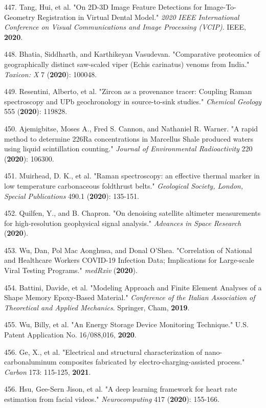 447. Tang, Hui, et al. "On 2D-3D Image Feature Detections for Image-To-Geometry Registration in Virtual Dental Model." \textit{2020 IEEE International Conference on Visual Communications and Image Processing (VCIP)}. IEEE, \textbf{2020}.

448. Bhatia, Siddharth, and Karthikeyan Vasudevan. "Comparative proteomics of geographically distinct saw-scaled viper (Echis carinatus) venoms from India." \textit{Toxicon: X} 7 (\textbf{2020}): 100048.

449. Resentini, Alberto, et al. "Zircon as a provenance tracer: Coupling Raman spectroscopy and UPb geochronology in source-to-sink studies." \textit{Chemical Geology} 555 (\textbf{2020}): 119828.

450. Ajemigbitse, Moses A., Fred S. Cannon, and Nathaniel R. Warner. "A rapid method to determine 226Ra concentrations in Marcellus Shale produced waters using liquid scintillation counting." \textit{Journal of Environmental Radioactivity} 220 (\textbf{2020}): 106300.

451. Muirhead, D. K., et al. "Raman spectroscopy: an effective thermal marker in low temperature carbonaceous fold\textendash{}thrust belts." \textit{Geological Society, London, Special Publications} 490.1 (\textbf{2020}): 135-151.

452. Quilfen, Y., and B. Chapron. "On denoising satellite altimeter measurements for high-resolution geophysical signal analysis." \textit{Advances in Space Research} (\textbf{2020}).

453. Wu, Dan, Pol Mac Aonghusa, and Donal O'Shea. "Correlation of National and Healthcare Workers COVID-19 Infection Data; Implications for Large-scale Viral Testing Programs." \textit{medRxiv} (\textbf{2020}).

454. Battini, Davide, et al. "Modeling Approach and Finite Element Analyses of a Shape Memory Epoxy-Based Material." \textit{Conference of the Italian Association of Theoretical and Applied Mechanics}. Springer, Cham, \textbf{2019}.

455. Wu, Billy, et al. "An Energy Storage Device Monitoring Technique." U.S. Patent Application No. 16/088,016, \textbf{2020}.

456. Ge, X., et al. "Electrical and structural characterization of nano-carbon\textendash{}aluminum composites fabricated by electro-charging-assisted process." \textit{Carbon} 173: 115-125, \textbf{2021}.

456. Hsu, Gee-Sern Jison, et al. "A deep learning framework for heart rate estimation from facial videos." \textit{Neurocomputing} 417 (\textbf{2020}): 155-166.


